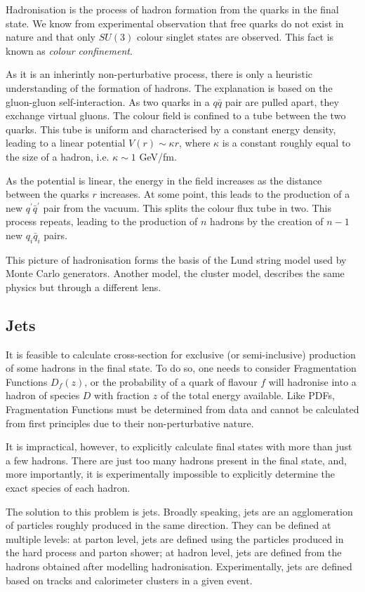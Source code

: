 \documentclass[10pt,a4paper]{book}
\begin{document}
Hadronisation is the process of hadron formation from the quarks in the final state. We know from experimental observation that free quarks do not exist in nature and that only $SU(3)$ colour singlet states are observed. This fact is known as \emph{colour confinement}. 

As it is an inherintly non-perturbative process, there is only a heuristic understanding of the formation of hadrons. The explanation is based on the gluon-gluon self-interaction. As two quarks in a $q\bar{q}$ pair are pulled apart, they exchange virtual gluons. The colour field is confined to a tube between the two quarks. This tube is uniform and characterised by a constant energy density, leading to a linear potential $V(r) \sim \kappa r$, where $\kappa$ is a constant roughly equal to the size of a hadron, i.e. $\kappa \sim 1$ GeV/fm. 

As the potential is linear, the energy in the field increases as the distance between the quarks $r$ increases. At some point, this leads to the production of a new $q^\prime\bar{q}^\prime$ pair from the vacuum. This splits the colour flux tube in two. This process repeats, leading to the production of $n$ hadrons by the creation of $n-1$ new $q_i\bar{q}_i$ pairs. 

This picture of hadronisation forms the basis of the Lund string model used by Monte Carlo generators. Another model, the cluster model, describes the same physics but through a different lens. 

\subsection{Jets}

It is feasible to calculate cross-section for exclusive (or semi-inclusive) production of some hadrons in the final state. To do so, one needs to consider Fragmentation Functions $D_f(z)$, or the probability of a quark of flavour $f$ will hadronise into a hadron of species $D$ with fraction $z$ of the total energy available. Like PDFs, Fragmentation Functions must be determined from data and cannot be calculated from first principles due to their non-perturbative nature.

It is impractical, however, to explicitly calculate final states with more than just a few hadrons. There are just too many hadrons present in the final state, and, more importantly, it is experimentally impossible to explicitly determine the exact species of each hadron. 

The solution to this problem is jets. Broadly speaking, jets are an agglomeration of particles roughly produced in the same direction. They can be defined at multiple levels: at parton level, jets are defined using the particles produced in the hard process and parton shower; at hadron level, jets are defined from the hadrons obtained after modelling hadronisation. Experimentally, jets are defined based on tracks and calorimeter clusters in a given event.
\end{document}
